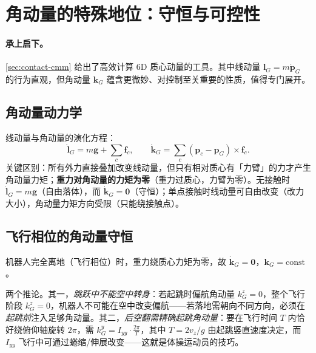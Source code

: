 \section{角动量的特殊地位：守恒与可控性}
\label{sec:contact-angular}

\paragraph{承上启下。}
\cref{sec:contact-cmm} 给出了高效计算 6D 质心动量的工具。其中线动量 $\boldsymbol{l}_G=m\dot{\boldsymbol{p}}_G$ 的行为直观，但角动量 $\boldsymbol{k}_G$ 蕴含更微妙、对控制至关重要的性质，值得专门展开。

\subsection{角动量动力学}
\label{subsec:angular-dynamics}

线动量与角动量的演化方程：
\begin{equation}
  \dot{\boldsymbol{l}}_G=m\boldsymbol{g}+\sum_c\boldsymbol{f}_c,\qquad
  \dot{\boldsymbol{k}}_G=\sum_c(\boldsymbol{p}_c-\boldsymbol{p}_G)\times\boldsymbol{f}_c.
  \label{eq:momentum-rate}
\end{equation}
关键区别：所有外力直接叠加改变线动量，但只有相对质心有「力臂」的力才产生角动量力矩；\textbf{重力对角动量的力矩为零}（重力过质心，力臂为零）。无接触时 $\dot{\boldsymbol{l}}_G=m\boldsymbol{g}$（自由落体），而 $\dot{\boldsymbol{k}}_G=\boldsymbol{0}$（守恒）；单点接触时线动量可自由改变（改力大小），角动量力矩方向受限（只能绕接触点）。

\subsection{飞行相位的角动量守恒}
\label{subsec:flight-conservation}

\begin{theorem}[飞行相位角动量守恒]
\label{thm:angular-conservation}
机器人完全离地（飞行相位）时，重力绕质心力矩为零，故 $\dot{\boldsymbol{k}}_G=\boldsymbol{0}$，$\boldsymbol{k}_G=\text{const}$。
\end{theorem}

\noindent 两个推论。其一，\emph{跳跃中不能空中转身}：若起跳时偏航角动量 $k_G^z=0$，整个飞行阶段 $k_G^z=0$，机器人不可能在空中改变偏航——若落地需朝向不同方向，必须在\emph{起跳前}注入足够角动量。其二，\emph{后空翻需精确起跳角动量}：要在飞行时间 $T$ 内恰好绕俯仰轴旋转 $2\pi$，需 $k_G^y=I_{yy}\cdot\tfrac{2\pi}{T}$，其中 $T=2v_z/g$ 由起跳竖直速度决定，而 $I_{yy}$ 飞行中可通过蜷缩/伸展改变——这就是体操运动员的技巧。

